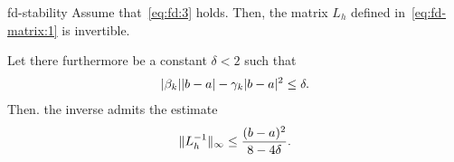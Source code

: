 \begin{Theorem}{fd-stability}
  Assume that~\eqref{eq:fd:3} holds.  Then, the matrix $L_h$ defined
  in~\eqref{eq:fd-matrix:1} is invertible.

  Let there furthermore be a constant $\delta < 2$ such that
  \begin{gather}
    \label{eq:fd:1}
    \lvert\beta_k\rvert \lvert b-a\rvert - \gamma_k \lvert b-a\rvert^2 \le \delta.
  \end{gather}
  Then. the inverse admits the estimate
  \begin{gather}
    \label{eq:fd:5}
    \lVert L_h^{-1}\rVert_\infty \le \frac{(b-a)^2}{8-4\delta}.
  \end{gather}
\end{Theorem}


